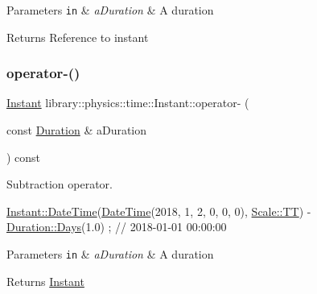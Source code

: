\begin{DoxyParams}[1]{Parameters}
\mbox{\tt in}  & {\em a\+Duration} & A duration \\
\hline
\end{DoxyParams}
\begin{DoxyReturn}{Returns}
Reference to instant 
\end{DoxyReturn}
\mbox{\label{classlibrary_1_1physics_1_1time_1_1_instant_a7b64292c796d6c54bfab311a1e13735f}} 
\subsubsection{\texorpdfstring{operator-\/()}{operator-()}\hspace{0.1cm}{\footnotesize\ttfamily [1/2]}}
{\footnotesize\ttfamily \hyperlink{classlibrary_1_1physics_1_1time_1_1_instant}{Instant} library\+::physics\+::time\+::\+Instant\+::operator-\/ (\begin{DoxyParamCaption}\item[{const \hyperlink{classlibrary_1_1physics_1_1time_1_1_duration}{Duration} \&}]{a\+Duration }\end{DoxyParamCaption}) const}



Subtraction operator. 


\begin{DoxyCode}
\hyperlink{classlibrary_1_1physics_1_1time_1_1_instant_ac827b6ffa57ce75a3c56c462d4c872f8}{Instant::DateTime}(\hyperlink{classlibrary_1_1physics_1_1time_1_1_instant_ac827b6ffa57ce75a3c56c462d4c872f8}{DateTime}(2018, 1, 2, 0, 0, 0), 
      \hyperlink{namespacelibrary_1_1physics_1_1time_a09d2bc9fbc7b0b5f92e1419bd655e6bbadf1f3edb9115acb0a1e04209b7a9937b}{Scale::TT}) - \hyperlink{classlibrary_1_1physics_1_1time_1_1_duration_abf1323fa113b5203747ce9aec5c969fc}{Duration::Days}(1.0) ; \textcolor{comment}{// 2018-01-01 00:00:00}
\end{DoxyCode}



\begin{DoxyParams}[1]{Parameters}
\mbox{\tt in}  & {\em a\+Duration} & A duration \\
\hline
\end{DoxyParams}
\begin{DoxyReturn}{Returns}
\hyperlink{classlibrary_1_1physics_1_1time_1_1_instant}{Instant} 
\end{DoxyReturn}
\mbox{\label{classlibrary_1_1physics_1_1time_1_1_instant_a913a30067f54516382a5ea6548d2a16d}} 
